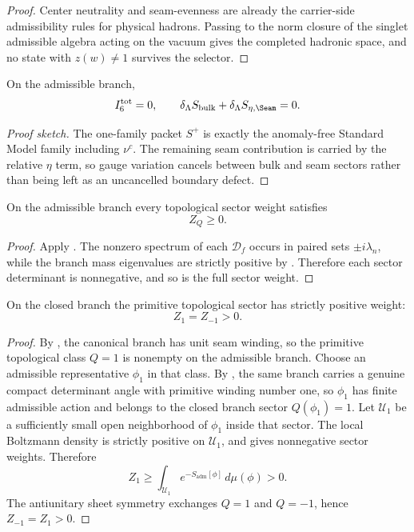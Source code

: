 
\begin{proof}
Center neutrality and seam-evenness are already the carrier-side admissibility rules for physical hadrons. Passing to the norm closure of the singlet admissible algebra acting on the vacuum gives the completed hadronic space, and no state with $z(w)\neq 1$ survives the selector.
\end{proof}

\begin{theorem}
On the admissible branch,
\[
I_6^{\mathrm{tot}}=0,
\qquad
\delta_\Lambda S_{\mathrm{bulk}}+\delta_\Lambda S_{\eta,\Seam}=0.
\]
\end{theorem}

\begin{proof}[Proof sketch]
The one-family packet $S^+$ is exactly the anomaly-free Standard Model family including $\nu^c$. The remaining seam contribution is carried by the relative $\eta$ term, so gauge variation cancels between bulk and seam sectors rather than being left as an uncancelled boundary defect.
\end{proof}

\begin{lemma}
\label{lem:topological-sector-positivity}
On the admissible branch every topological sector weight satisfies
\[
Z_Q\ge 0.
\]
\end{lemma}

\begin{proof}
Apply . The nonzero spectrum of each $\mathcal D_f$ occurs in
paired sets $\pm i\lambda_n$, while the branch mass eigenvalues are strictly positive by
. Therefore each sector determinant is nonnegative, and so is the
full sector weight.
\end{proof}

\begin{lemma}
\label{lem:nontrivial-topological-support}
On the closed branch the primitive topological sector has strictly positive weight:
\[
Z_1=Z_{-1}>0.
\]
\end{lemma}

\begin{proof}
By , the canonical branch has unit seam winding, so the primitive
topological class $Q=1$ is nonempty on the admissible branch. Choose an admissible representative
$\phi_1$ in that class. By , the same branch carries a genuine compact
determinant angle with primitive winding number one, so $\phi_1$ has finite admissible action and
belongs to the closed branch sector $Q(\phi_1)=1$. Let $\mathcal U_1$ be a sufficiently small open
neighborhood of $\phi_1$ inside that sector. The local Boltzmann density is strictly positive on
$\mathcal U_1$, and  gives nonnegative sector weights.
Therefore
\[
Z_1
\ge
\int_{\mathcal U_1} e^{-S_{\mathrm{adm}}[\phi]}\,d\mu(\phi)
>
0.
\]
The antiunitary sheet symmetry exchanges $Q=1$ and $Q=-1$, hence $Z_{-1}=Z_1>0$.
\end{proof}

